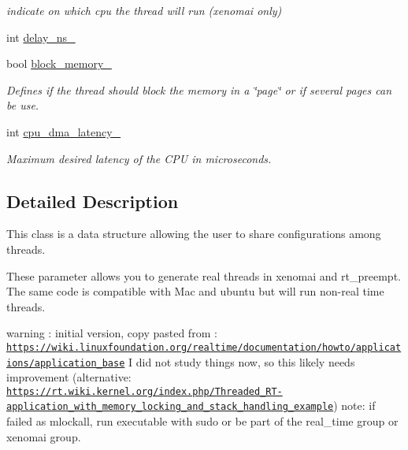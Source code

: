 \begin{DoxyCompactItemize}
\begin{DoxyCompactList}\small\item\em indicate on which cpu the thread will run (xenomai only) \end{DoxyCompactList}\item 
int \hyperlink{classreal__time__tools_1_1RealTimeThreadParameters_a50e8eae41f8284867f073aa802d9afa2}{delay\+\_\+ns\+\_\+}
\item 
bool \hyperlink{classreal__time__tools_1_1RealTimeThreadParameters_a134856e17552d3f31a093f3a1f5d1639}{block\+\_\+memory\+\_\+}
\begin{DoxyCompactList}\small\item\em Defines if the thread should block the memory in a \char`\"{}page\char`\"{} or if several pages can be use. \end{DoxyCompactList}\item 
int \hyperlink{classreal__time__tools_1_1RealTimeThreadParameters_afc9891b44025aab8b383e91d907d41b0}{cpu\+\_\+dma\+\_\+latency\+\_\+}
\begin{DoxyCompactList}\small\item\em Maximum desired latency of the C\+PU in microseconds. \end{DoxyCompactList}\end{DoxyCompactItemize}


\subsection{Detailed Description}
This class is a data structure allowing the user to share configurations among threads. 

These parameter allows you to generate real threads in xenomai and rt\+\_\+preempt. The same code is compatible with Mac and ubuntu but will run non-\/real time threads.

warning \+: initial version, copy pasted from \+: \href{https://wiki.linuxfoundation.org/realtime/documentation/howto/applications/application_base}{\tt https\+://wiki.\+linuxfoundation.\+org/realtime/documentation/howto/applications/application\+\_\+base} I did not study things now, so this likely needs improvement (alternative\+: \href{https://rt.wiki.kernel.org/index.php/Threaded_RT-application_with_memory_locking_and_stack_handling_example}{\tt https\+://rt.\+wiki.\+kernel.\+org/index.\+php/\+Threaded\+\_\+\+R\+T-\/application\+\_\+with\+\_\+memory\+\_\+locking\+\_\+and\+\_\+stack\+\_\+handling\+\_\+example}) note\+: if failed as mlockall, run executable with sudo or be part of the real\+\_\+time group or xenomai group. 

